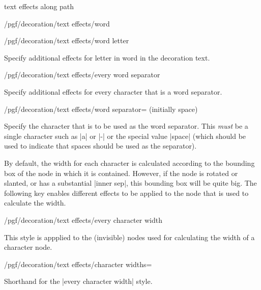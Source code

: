\begin{decoration}{text effects along path}
\begin{stylekey}{/pgf/decoration/text effects/word }
\end{stylekey}



\begin{stylekey}{/pgf/decoration/text effects/word  letter }

  Specify additional effects for letter  in word  in the decoration text.
  
\end{stylekey}



\begin{stylekey}{/pgf/decoration/text effects/every word separator}

  Specify additional effects for every character that is a word separator.
  
\end{stylekey}



\begin{key}{/pgf/decoration/text effects/word separator= (initially space)}

  Specify the character that is to be used as the word separator.
  This \emph{must} be a single character such as |a| or |-| or
  the special value |space| (which should be used to indicate that
  spaces should be used as the separator).
  
\end{key}

	By default, the width for each character is calculated according
	to the bounding box of the node in which it is contained.
	However, if the node is rotated or slanted, or has a substantial
	|inner sep|, this bounding box
	will be quite big. The following key enables different effects
	to be applied to the node that is used to calculate the 
	width.




\begin{stylekey}{/pgf/decoration/text effects/every character width}

	This style is appplied to the (invisible) nodes used for calculating
	the width of a character node.
	
\end{stylekey}



\begin{key}{/pgf/decoration/text effects/character widths=}

  Shorthand for the |every character width| style.


\end{key}
\end{decoration}
